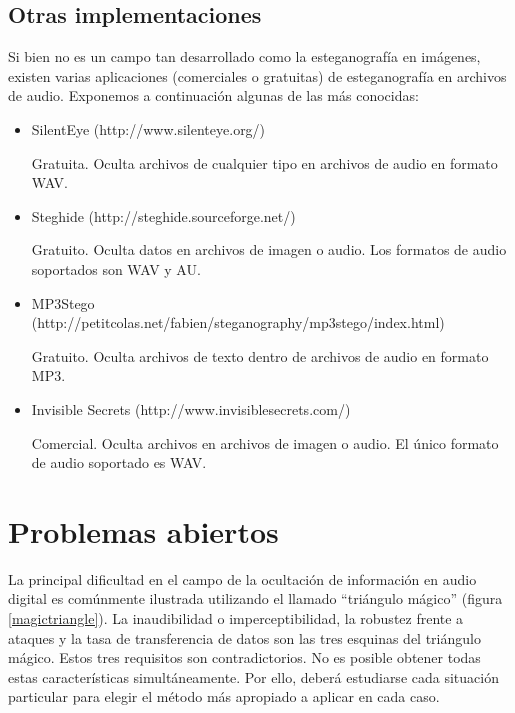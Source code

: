 \documentclass[12pt]{article}
\begin{document}
\subsection{Otras implementaciones}

Si bien no es un campo tan desarrollado como la esteganografía en imágenes, existen varias aplicaciones (comerciales o gratuitas) de esteganografía en archivos de audio. Exponemos a continuación algunas de las más conocidas:

\begin{itemize}

\item SilentEye (http://www.silenteye.org/)

Gratuita. Oculta archivos de cualquier tipo en archivos de audio en formato WAV.

\item Steghide (http://steghide.sourceforge.net/)

Gratuito. Oculta datos en archivos de imagen o audio. Los formatos de audio soportados son WAV y AU.

\item MP3Stego (http://petitcolas.net/fabien/steganography/mp3stego/index.html)

Gratuito. Oculta archivos de texto dentro de archivos de audio en formato MP3.

\item Invisible Secrets (http://www.invisiblesecrets.com/)

Comercial. Oculta archivos en archivos de imagen o audio. El único formato de audio soportado es WAV.

\end{itemize}

\newpage
\section{Problemas abiertos}

La principal dificultad en el campo de la ocultación de información en audio digital es comúnmente ilustrada utilizando el llamado ``triángulo mágico'' (figura \ref{magictriangle}). La inaudibilidad o imperceptibilidad, la robustez frente a ataques y la tasa de transferencia de datos son las tres esquinas del triángulo mágico. Estos tres requisitos son contradictorios. No es posible obtener todas estas características simultáneamente. Por ello, deberá estudiarse cada situación particular para elegir el método más apropiado a aplicar en cada caso.
\end{document}

